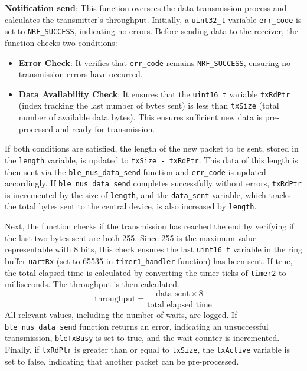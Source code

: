 \documentclass{Configuration_Files/PoliMi3i_thesis}
\begin{document}
\textbf{Notification send}:
This function oversees the data transmission process and calculates the transmitter's throughput. Initially, a \texttt{uint32\_t} variable \texttt{err\_code} is set to \texttt{NRF\_SUCCESS}, indicating no errors. Before sending data to the receiver, the function checks two conditions:

\begin{itemize}
    \item \textbf{Error Check}: It verifies that \texttt{err\_code} remains \texttt{NRF\_SUCCESS}, ensuring no transmission errors have occurred.
    \item \textbf{Data Availability Check}: It ensures that the \texttt{uint16\_t} variable \texttt{txRdPtr} (index tracking the last number of bytes sent) is less than \texttt{txSize} (total number of available data bytes). This ensures sufficient new data is pre-processed and ready for transmission.
\end{itemize}

If both conditions are satisfied, the length of the new packet to be sent, stored in the \texttt{length} variable, is updated to \texttt{txSize - txRdPtr}. This data of this length is then sent via the \texttt{ble\_nus\_data\_send} function and \texttt{err\_code} is updated accordingly. If \texttt{ble\_nus\_data\_send} completes successfully without errors, \texttt{txRdPtr} is incremented by the size of \texttt{length}, and the \texttt{data\_sent} variable, which tracks the total bytes sent to the central device, is also increased by \texttt{length}. 

Next, the function checks if the transmission has reached the end by verifying if the last two bytes sent are both 255. Since 255 is the maximum value representable with 8 bits, this check ensures the last \texttt{uint16\_t} variable in the ring buffer \texttt{uartRx} (set to 65535 in \texttt{timer1\_handler} function) has been sent. If true, the total elapsed time is calculated by converting the timer ticks of \texttt{timer2} to milliseconds. The throughput is then calculated.
\[
\text{throughput} = \frac{\text{data\_sent} \times 8}{\text{total\_elapsed\_time}}
\]
All relevant values, including the number of waits, are logged. If \texttt{ble\_nus\_data\_send} function returns an error, indicating an unsuccessful transmission, \texttt{bleTxBusy} is set to true, and the wait counter is incremented. Finally, if \texttt{txRdPtr} is greater than or equal to \texttt{txSize}, the \texttt{txActive} variable is set to false, indicating that another packet can be pre-processed.
\end{document}
